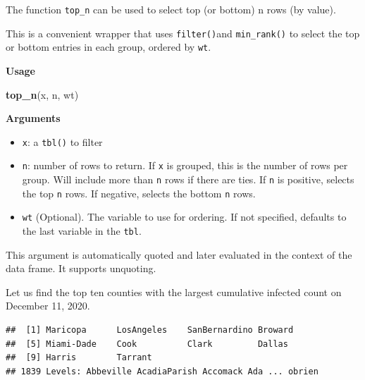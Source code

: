 \documentclass[]{book}
\newenvironment{Shaded}{\begin{snugshade}}{\end{snugshade}}
\newcommand{\KeywordTok}[1]{\textcolor[rgb]{0.13,0.29,0.53}{\textbf{#1}}}
\newcommand{\DataTypeTok}[1]{\textcolor[rgb]{0.13,0.29,0.53}{#1}}
\newcommand{\DecValTok}[1]{\textcolor[rgb]{0.00,0.00,0.81}{#1}}
\newcommand{\FloatTok}[1]{\textcolor[rgb]{0.00,0.00,0.81}{#1}}
\newcommand{\StringTok}[1]{\textcolor[rgb]{0.31,0.60,0.02}{#1}}
\newcommand{\CommentTok}[1]{\textcolor[rgb]{0.56,0.35,0.01}{\textit{#1}}}
\newcommand{\OperatorTok}[1]{\textcolor[rgb]{0.81,0.36,0.00}{\textbf{#1}}}
\newcommand{\NormalTok}[1]{#1}
\providecommand{\tightlist}{%
  \setlength{\itemsep}{0pt}\setlength{\parskip}{0pt}}
\begin{document}
The function \texttt{top\_n} can be used to select top (or bottom) n
rows (by value).

This is a convenient wrapper that uses \texttt{filter()}and
\texttt{min\_rank()} to select the top or bottom entries in each group,
ordered by \texttt{wt}.

\textbf{Usage}

\begin{Shaded}
\begin{Highlighting}[]
\KeywordTok{top_n}\NormalTok{(x, n, wt)}
\end{Highlighting}
\end{Shaded}

\textbf{Arguments}

\begin{itemize}
\tightlist
\item
  \texttt{x}: a \texttt{tbl()} to filter
\item
  \texttt{n}: number of rows to return. If \texttt{x} is grouped, this
  is the number of rows per group. Will include more than \texttt{n}
  rows if there are ties. If \texttt{n} is positive, selects the top
  \texttt{n} rows. If negative, selects the bottom \texttt{n} rows.
\item
  \texttt{wt} (Optional). The variable to use for ordering. If not
  specified, defaults to the last variable in the \texttt{tbl}.
\end{itemize}

This argument is automatically quoted and later evaluated in the context
of the data frame. It supports unquoting.

Let us find the top ten counties with the largest cumulative infected
count on December 11, 2020.

\begin{Shaded}
\end{Shaded}

\begin{verbatim}
##  [1] Maricopa      LosAngeles    SanBernardino Broward      
##  [5] Miami-Dade    Cook          Clark         Dallas       
##  [9] Harris        Tarrant      
## 1839 Levels: Abbeville AcadiaParish Accomack Ada ... obrien
\end{verbatim}
\end{document}
